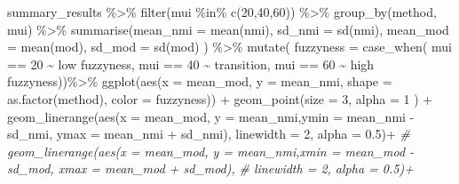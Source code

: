 \documentclass[
]{article}
\newenvironment{Shaded}{\begin{snugshade}}{\end{snugshade}}
\newcommand{\AttributeTok}[1]{\textcolor[rgb]{0.77,0.63,0.00}{#1}}
\newcommand{\CommentTok}[1]{\textcolor[rgb]{0.56,0.35,0.01}{\textit{#1}}}
\newcommand{\DecValTok}[1]{\textcolor[rgb]{0.00,0.00,0.81}{#1}}
\newcommand{\FloatTok}[1]{\textcolor[rgb]{0.00,0.00,0.81}{#1}}
\newcommand{\FunctionTok}[1]{\textcolor[rgb]{0.00,0.00,0.00}{#1}}
\newcommand{\NormalTok}[1]{#1}
\newcommand{\SpecialCharTok}[1]{\textcolor[rgb]{0.00,0.00,0.00}{#1}}
\newcommand{\StringTok}[1]{\textcolor[rgb]{0.31,0.60,0.02}{#1}}
\begin{document}
\newpage

\begin{Shaded}
\begin{Highlighting}[]
\NormalTok{summary\_results }\SpecialCharTok{\%\textgreater{}\%} 
  \FunctionTok{filter}\NormalTok{(mui }\SpecialCharTok{\%in\%} \FunctionTok{c}\NormalTok{(}\DecValTok{20}\NormalTok{,}\DecValTok{40}\NormalTok{,}\DecValTok{60}\NormalTok{)) }\SpecialCharTok{\%\textgreater{}\%} 
  \FunctionTok{group\_by}\NormalTok{(method, mui) }\SpecialCharTok{\%\textgreater{}\%} 
    \FunctionTok{summarise}\NormalTok{(}\AttributeTok{mean\_nmi =} \FunctionTok{mean}\NormalTok{(nmi), }\AttributeTok{sd\_nmi =} \FunctionTok{sd}\NormalTok{(nmi), }
              \AttributeTok{mean\_mod =} \FunctionTok{mean}\NormalTok{(mod), }\AttributeTok{sd\_mod =} \FunctionTok{sd}\NormalTok{(mod) ) }\SpecialCharTok{\%\textgreater{}\%}
  \FunctionTok{mutate}\NormalTok{( }\AttributeTok{fuzzyness =} \FunctionTok{case\_when}\NormalTok{(}
\NormalTok{    mui }\SpecialCharTok{==} \DecValTok{20} \SpecialCharTok{\textasciitilde{}} \StringTok{\textquotesingle{}  low fuzzyness\textquotesingle{}}\NormalTok{,}
\NormalTok{    mui }\SpecialCharTok{==} \DecValTok{40} \SpecialCharTok{\textasciitilde{}} \StringTok{\textquotesingle{} transition\textquotesingle{}}\NormalTok{,}
\NormalTok{    mui }\SpecialCharTok{==} \DecValTok{60} \SpecialCharTok{\textasciitilde{}} \StringTok{\textquotesingle{}high fuzzyness\textquotesingle{}}\NormalTok{))}\SpecialCharTok{\%\textgreater{}\%}
  \FunctionTok{ggplot}\NormalTok{(}\FunctionTok{aes}\NormalTok{(}\AttributeTok{x =}\NormalTok{ mean\_mod, }\AttributeTok{y =}\NormalTok{ mean\_nmi, }\AttributeTok{shape =} \FunctionTok{as.factor}\NormalTok{(method), }\AttributeTok{color =}\NormalTok{ fuzzyness)) }\SpecialCharTok{+}
  \FunctionTok{geom\_point}\NormalTok{(}\AttributeTok{size =} \DecValTok{3}\NormalTok{, }\AttributeTok{alpha =} \DecValTok{1}\NormalTok{ ) }\SpecialCharTok{+}
  \FunctionTok{geom\_linerange}\NormalTok{(}\FunctionTok{aes}\NormalTok{(}\AttributeTok{x =}\NormalTok{ mean\_mod, }\AttributeTok{y =}\NormalTok{ mean\_nmi,}\AttributeTok{ymin =}\NormalTok{ mean\_nmi }\SpecialCharTok{{-}}\NormalTok{ sd\_nmi, }\AttributeTok{ymax =}\NormalTok{ mean\_nmi }\SpecialCharTok{+}\NormalTok{ sd\_nmi), }
                 \AttributeTok{linewidth =} \DecValTok{2}\NormalTok{, }\AttributeTok{alpha =} \FloatTok{0.5}\NormalTok{)}\SpecialCharTok{+}
\CommentTok{\#  geom\_linerange(aes(x = mean\_mod, y = mean\_nmi,xmin = mean\_mod {-} sd\_mod, xmax = mean\_mod + sd\_mod), }
\CommentTok{\#                 linewidth = 2, alpha = 0.5)+}

\end{Highlighting}
\end{Shaded}
\end{document}
